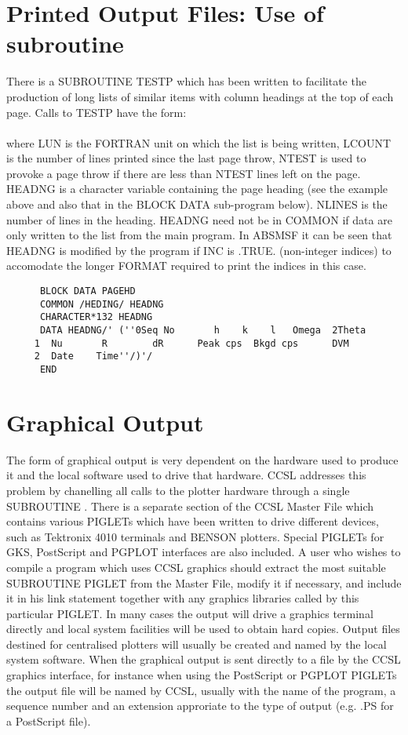 \section{Printed Output Files: Use of subroutine }
There is a SUBROUTINE TESTP which
has been written to facilitate the production of long lists of similar
items with column headings at the top of each page.  Calls to TESTP have
the form:\\ 
\\ 
where LUN is the FORTRAN unit on which the list is being written, LCOUNT
is the number of lines printed since the last page throw, NTEST is used
to provoke a page throw if there are less than NTEST lines left on the
page.\p
HEADNG is a character variable containing the page heading (see
the example above and also that 
in the BLOCK DATA sub-program below). NLINES is the number of
lines in the heading. HEADNG need not be in COMMON if data are only
written to the list from the main program. In ABSMSF it can be seen that
HEADNG is modified by the program if INC is .TRUE. (non-integer indices)
to accomodate the longer FORMAT required to print the indices in this case.
\\[0.2ex]
\begin{verbatim}      BLOCK DATA PAGEHD
      COMMON /HEDING/ HEADNG
      CHARACTER*132 HEADNG
      DATA HEADNG/' (''0Seq No       h    k    l   Omega  2Theta   
     1  Nu       R        dR      Peak cps  Bkgd cps      DVM
     2  Date    Time''/)'/
      END
\end{verbatim}\ssk
\section{Graphical Output}
%
The form of graphical output is very dependent on the hardware used
to produce it and the local software used to drive that hardware.
CCSL addresses this problem by chanelling all calls to the plotter
hardware through a single SUBROUTINE .
\p
There is a separate
section of the CCSL Master File which contains various PIGLETs which have
been written to drive different devices, such as Tektronix 
4010 terminals and BENSON plotters. Special PIGLETs for GKS,
PostScript and PGPLOT interfaces are also included. A user who wishes to compile
a program which uses CCSL graphics should extract the most suitable
SUBROUTINE PIGLET from the Master File, modify it if necessary, and
include it in his link statement together with any graphics libraries
called by this particular PIGLET.
\p
In many cases the output will drive a graphics terminal directly
and local system facilities will be used to obtain hard copies.
Output files destined for centralised plotters will usually be
created and named by the local system software. 
\p
When the graphical output is sent directly to a file
by the CCSL graphics interface, for instance when using the
PostScript or PGPLOT PIGLETs the output file will be named by CCSL, usually
with the name of the program, a sequence number and an extension approriate to the type
of output (e.g. .PS for a PostScript file).

